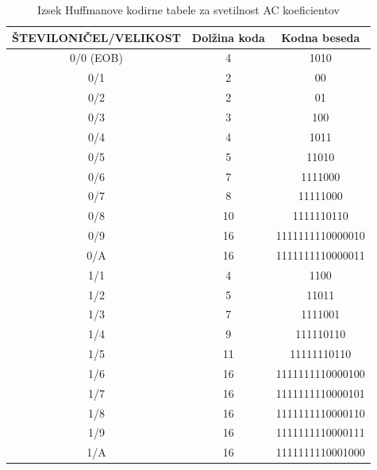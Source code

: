 \documentclass[a4paper,12pt,openright]{book}
\begin{document}
\begin{table}[ht]
\centering
\begin{tabular}{|c|c|c|}
\hline
ŠTEVILONIČEL/VELIKOST& Dolžina koda& Kodna beseda\\
\hline
0/0 (EOB) &4 &1010\\
0/1       &2 &00\\
0/2       &2 &01\\
0/3       &3 &100\\
0/4       &4 &1011\\
0/5       &5 &11010\\
0/6       &7 &1111000\\
0/7       &8 &11111000\\
0/8       &10 &1111110110\\
0/9       &16 &1111111110000010\\
0/A       &16 &1111111110000011\\
1/1       &4 &1100\\
1/2       &5 &11011\\
1/3       &7 &1111001\\
1/4       &9 &111110110\\
1/5       &11 &11111110110\\
1/6       &16 &1111111110000100\\
1/7       &16 &1111111110000101\\
1/8       &16 &1111111110000110\\
1/9       &16 &1111111110000111\\
1/A       &16 &1111111110001000\\
\hline
\end{tabular}
\caption{Izsek Huffmanove kodirne tabele za svetilnost AC koeficientov}
\label{tab:Huffman_AC_luminance}
\end{table}
\end{document}
